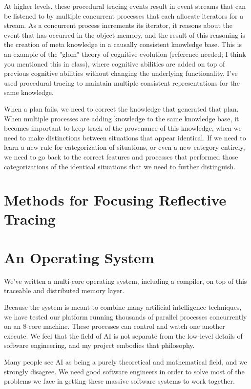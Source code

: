 At higher levels, these procedural tracing events result in event
streams that can be listened to by multiple concurrent processes that
each allocate iterators for a stream.  As a concurrent process
increments its iterator, it reasons about the event that has occurred in
the object memory, and the result of this reasoning is the creation of
meta knowledge in a causally consistent knowledge base.  This is an
example of the "glom" theory of cognitive evolution (reference needed; I
think you mentioned this in class), where cognitive abilities are added
on top of previous cognitive abilities without changing the underlying
functionality.  I've used procedural tracing to maintain multiple
consistent representations for the same knowledge.

When a plan fails, we need to correct the knowledge that generated that
plan.  When multiple processes are adding knowledge to the same
knowledge base, it becomes important to keep track of the provenance of
this knowledge, when we need to make distinctions between situations
that appear identical.  If we need to learn a new rule for
categorization of situations, or even a new category entirely, we need
to go back to the correct features and processes that performed those
categorizations of the identical situations that we need to further
distinguish.

\section{Methods for Focusing Reflective Tracing}
\label{sec:methods_for_focusing_reflective_tracing}



\section{An Operating System}

We've written a multi-core operating system, including a
compiler, on top of this traceable and distributed memory layer.

Because the system is meant to combine many artificial intelligence
techniques, we have tested our platform running thousands of parallel
processes concurrently on an 8-core machine.  These processes can
control and watch one another execute.  We feel that the field of AI
is not separate from the low-level details of software engineering,
and my project embodies that philosophy.

Many people see AI as being a purely theoretical and mathematical
field, and we strongly disagree.  We need good software engineers in
order to solve most of the problems we face in getting these massive
software systems to work together.

